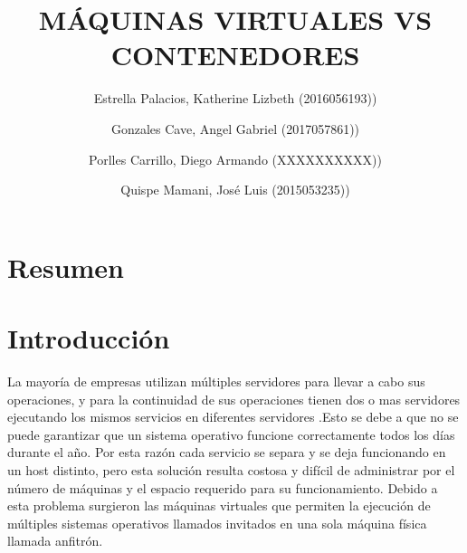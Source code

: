 \documentclass[preprint,12pt]{elsarticle}
\begin{document}
	
	\begin{frontmatter} 

		\title{\huge MÁQUINAS VIRTUALES VS CONTENEDORES}
		
		\author{Estrella Palacios, Katherine Lizbeth              	(2016056193))}
		\author{Gonzales Cave, Angel Gabriel              	        (2017057861))}
		\author{Porlles Carrillo, Diego Armando	         	(XXXXXXXXXX))} %
		\author{Quispe Mamani, José Luis             		(2015053235))} %
		\address{Escuela Profesional de Ingeniería de Sistemas}
		\address{Universidad Privada de Tacna}
		\address{Tacna, Perú}
		

		\begin{abstract}
		


		\end{abstract}


	\end{frontmatter}


\section{Resumen}






\section{Introducción}

La mayoría de empresas utilizan múltiples servidores para llevar a cabo sus operaciones, y para la continuidad de sus operaciones tienen dos o mas servidores ejecutando los mismos servicios en diferentes servidores .Esto se debe a que no se puede garantizar que un sistema operativo funcione correctamente todos los días durante el año. Por esta razón cada servicio se separa y se deja funcionando en un host distinto, pero esta solución resulta costosa y difícil de administrar por el número de máquinas y el espacio requerido para su funcionamiento.
Debido a esta problema surgieron las máquinas virtuales que permiten la ejecución de múltiples sistemas operativos llamados invitados en una sola máquina física llamada anfitrón.  
\end{document}
